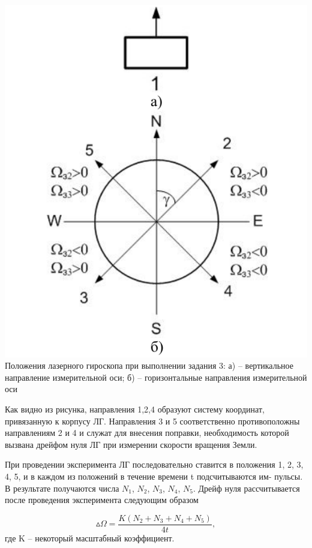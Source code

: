 \documentclass[a4paper,12pt]{article} %
\begin{document}
\begin{center}
    \includegraphics[scale=0.7]{pic9}\\
    \caption{Положения лазерного гироскопа при выполнении задания 3:
а) – вертикальное направление измерительной оси;
б) – горизонтальные направления измерительной оси}
\end{center}

Как видно из рисунка, направления 1,2,4 образуют систему координат,
привязанную к корпусу ЛГ. Направления 3 и 5 соответственно противоположны направлениям 2 и 4 и служат для внесения поправки, необходимость которой вызвана дрейфом нуля ЛГ при измерении скорости вращения Земли.

При проведении эксперимента ЛГ последовательно ставится в положения
1, 2, 3, 4, 5, и в каждом из положений в течение времени t подсчитываются им-
пульсы. В результате получаются числа $N_1$, $N_2$, $N_3$, $N_4$, $N_5$. Дрейф нуля рассчитывается после проведения эксперимента следующим образом

\begin{equation}
    \vartriangle \!\! \Omega = \frac {K(N_2 + N_3 + N_4 + N_5)} {4t},
\end{equation}
где K -- некоторый масштабный коэффициент.
\end{document}
